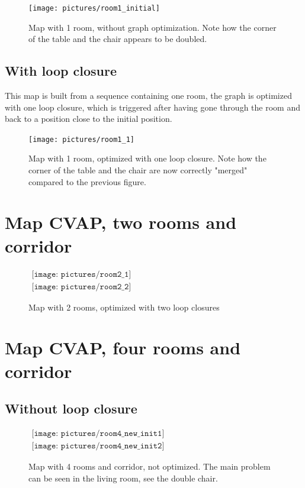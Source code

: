 \begin{figure}[H]
\centering
\texttt{[image: pictures/room1\_initial]}
\caption{Map with 1 room, without graph optimization. Note how the corner of the table and the chair appears to be doubled.}
\end{figure}

\subsection{With loop closure}
This map is built from a sequence containing one room, the graph is optimized with one loop closure, which is triggered after having gone through the room and back to a position close to the initial position. 

\begin{figure}[H]
\centering
\texttt{[image: pictures/room1\_1]}
\caption{Map with 1 room, optimized with one loop closure. Note how the corner of the table and the chair are now correctly "merged" compared to the previous figure.}
\end{figure}

\section{Map CVAP, two rooms and corridor}

\begin{figure}[H]
\centering$
 \begin{array}{c}
 \texttt{[image: pictures/room2\_1]}\\
 \texttt{[image: pictures/room2\_2]}
 \end{array}$
\caption{Map with 2 rooms, optimized with two loop closures}
\end{figure}

\section{Map CVAP, four rooms and corridor}

\subsection{Without loop closure}

\begin{figure}[H]
\centering$
 \begin{array}{c}
 \texttt{[image: pictures/room4\_new\_init1]}\\
 \texttt{[image: pictures/room4\_new\_init2]}
 \end{array}$
\caption{Map with 4 rooms and corridor, not optimized. The main problem can be seen in the living room, see the double chair.}
\end{figure}

